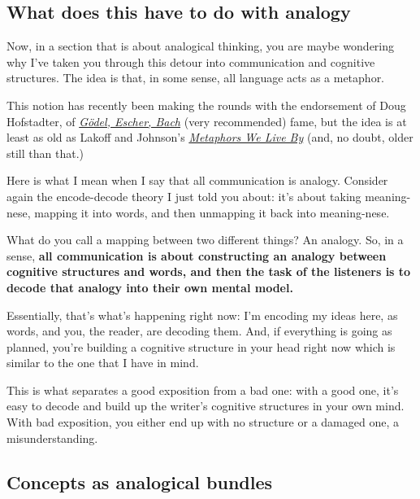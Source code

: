 \subsection{What does this have to do with
analogy}\label{what-does-this-have-to-do-with-analogy}

Now, in a section that is about analogical thinking, you are maybe
wondering why I've taken you through this detour into communication and
cognitive structures. The idea is that, in some sense, all language acts
as a metaphor.

This notion has recently been making the rounds with the endorsement of
Doug Hofstadter, of
\href{http://www.amazon.com/gp/product/0465026567/ref=as_li_tl?ie=UTF8\&camp=1789\&creative=390957\&creativeASIN=0465026567\&linkCode=as2\&tag=rsio-20}{\emph{Gödel,
Escher, Bach}} (very recommended) fame, but the idea is at least as old
as Lakoff and Johnson's
\href{http://www.amazon.com/gp/product/0226468011/ref=as_li_tl?ie=UTF8\&camp=1789\&creative=390957\&creativeASIN=0226468011\&linkCode=as2\&tag=rsio-20}{\emph{Metaphors
We Live By}} (and, no doubt, older still than that.)

Here is what I mean when I say that all communication is analogy.
Consider again the encode-decode theory I just told you about: it's
about taking meaning-nese, mapping it into words, and then unmapping it
back into meaning-nese.

What do you call a mapping between two different things? An analogy. So,
in a sense, \textbf{all communication is about constructing an analogy
between cognitive structures and words, and then the task of the
listeners is to decode that analogy into their own mental model.}

Essentially, that's what's happening right now: I'm encoding my ideas
here, as words, and you, the reader, are decoding them. And, if
everything is going as planned, you're building a cognitive structure in
your head right now which is similar to the one that I have in mind.

This is what separates a good exposition from a bad one: with a good
one, it's easy to decode and build up the writer's cognitive structures
in your own mind. With bad exposition, you either end up with no
structure or a damaged one, a misunderstanding.

\subsection{Concepts as analogical
  bundles}\label{concepts-as-analogical-bundles}

